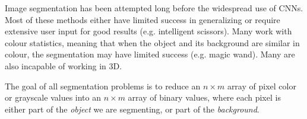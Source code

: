 Image segmentation has been attempted long before the widespread use of CNNs. Most of these methods either have limited success in generalizing or require extensive user input for good results (e.g. intelligent scissors). Many work with colour statistics, meaning that when the object and its background are similar in colour, the segmentation may have limited success (e.g. magic wand). Many are also incapable of working in 3D.

The goal of all segmentation problems is to reduce an $n \times m$ array of pixel color or grayscale values into an $n \times m$ array of binary values, where each pixel is either part of the \textit{object} we are segmenting, or part of the \textit{background}.